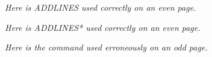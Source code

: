 \documentclass[twoside]{article}
\begin{document}
\lipsum[1-5]

\emph{Here is ADDLINES used correctly on an even page.}
\addline

\lipsum[3-6]

\emph{Here is ADDLINES* used correctly on an even page.}
\addline*

\lipsum[6-15]

\emph{Here is the command used erroneously on an odd page.}
\addlines

\lipsum[16-20]
\end{document}
